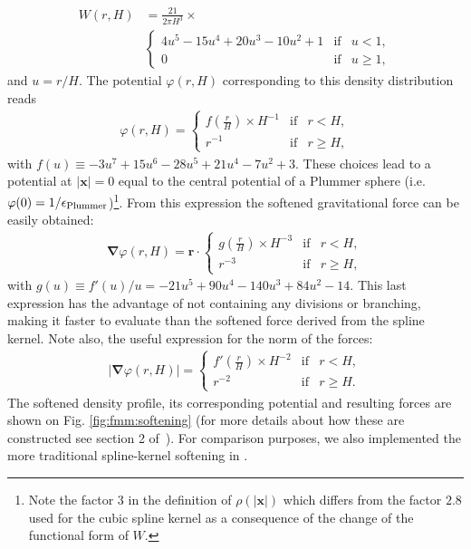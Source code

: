 \begin{align}
W(r,H) &= \frac{21}{2\pi H^3} \times \nonumber \\
&\left\lbrace\begin{array}{rcl}
4u^5 - 15u^4 + 20u^3 - 10u^2 + 1 & \mbox{if} & u < 1,\\
0 & \mbox{if} & u \geq 1,
\end{array}
\right.
\end{align}
and $u = r/H$. The potential $\varphi(r,H)$ corresponding to this density distribution reads
\begin{align}
\varphi(r,H) = 
\left\lbrace\begin{array}{rcl}
f(\frac{r}{H}) \times H^{-1} & \mbox{if} & r < H,\\
r^{-1} & \mbox{if} & r \geq H,
\end{array}
\right.
\label{eq:fmm:potential}
\end{align}
with $f(u) \equiv -3u^7 + 15u^6 - 28u^5 + 21u^4 - 7u^2 + 3$. These
choices lead to a potential at $|\mathbf{x}| = 0$ equal to the central
potential of a Plummer sphere (i.e. $\varphi(0) = 1/\epsilon_{\rm
  Plummer}$)\footnote{Note the factor $3$ in the definition of
  $\rho(|\mathbf{x}|)$ which differs from the factor $2.8$ used for
  the cubic spline kernel as a consequence of the change of the functional
  form of $W$.}. From this expression the softened gravitational force can
be easily obtained:
\begin{align}
\mathbf{\nabla}\varphi(r,H) = \mathbf{r} \cdot
\left\lbrace\begin{array}{rcl}
g(\frac{r}{H}) \times H^{-3} & \mbox{if} & r < H,\\
r^{-3} & \mbox{if} & r \geq H,
\end{array}
\right.
\label{eq:fmm:force}
\end{align}
with $g(u) \equiv f'(u)/u = -21u^5+90u^4-140u^3+84u^2-14$. This last
expression has the advantage of not containing any divisions or
branching, making it faster to evaluate than the softened force
derived from the \cite{Monaghan1985} spline kernel. Note also, the
useful expression for the norm of the forces:
\begin{align}
|\mathbf{\nabla}\varphi(r,H)| = 
\left\lbrace\begin{array}{rcl}
f'(\frac{r}{H}) \times H^{-2} & \mbox{if} & r < H,\\
r^{-2} & \mbox{if} & r \geq H.
\end{array}
\right.
\label{eq:fmm:force}
\end{align}
The softened density profile, its corresponding potential and
resulting forces are shown on Fig. \ref{fig:fmm:softening} (for more
details about how these are constructed see section 2
of~\cite{Price2007}). For comparison purposes, we also implemented the
more traditional spline-kernel softening in \swift.


